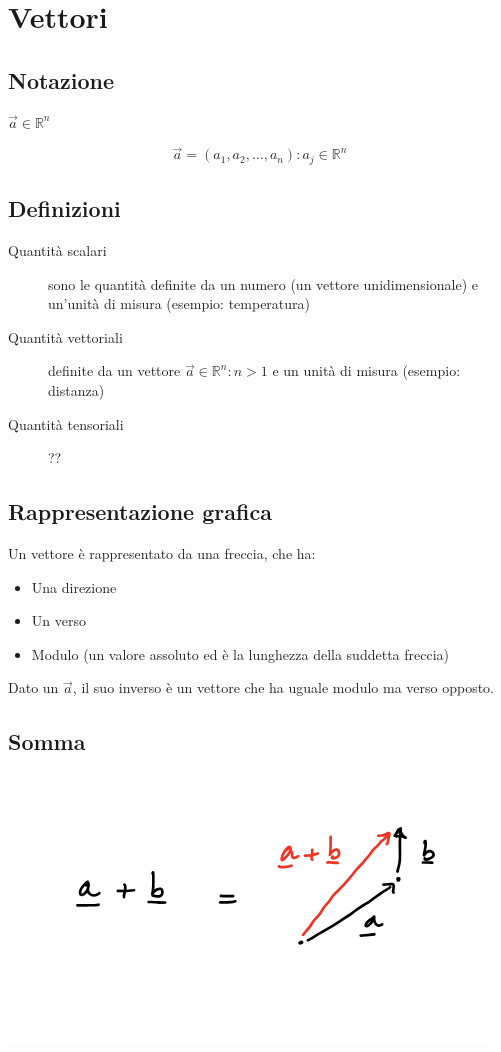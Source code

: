 \documentclass{subfiles}
\begin{document}
\section{Vettori}

\subsection{Notazione}

$\vec{a} \in \mathbb{R}^n$

$$
\vec{a} = (a_1, a_2, \dots, a_n) : a_j \in \mathbb{R}^n
$$

\subsection{Definizioni}

\begin{description}
    \item[Quantità scalari] sono le quantità definite da un numero (un vettore unidimensionale) e un'unità di misura (esempio: temperatura)
    \item[Quantità vettoriali] definite da un vettore $\vec{a} \in \mathbb{R}^n : n > 1$ e un unità di misura (esempio: distanza)
    \item[Quantità tensoriali] ??
\end{description}

\subsection{Rappresentazione grafica}

Un vettore è rappresentato da una freccia, che ha:

\begin{itemize}
    \item Una direzione
    \item Un verso
    \item Modulo (un valore assoluto ed è la lunghezza della suddetta freccia)
\end{itemize}

\noindent
Dato un $\vec{a}$, il suo inverso è un vettore che ha uguale modulo ma verso opposto.

\subsection{Somma}

\includegraphics[width=\columnwidth]{somma-di-vettori}
\end{document}
